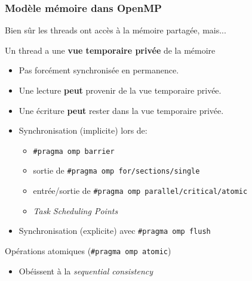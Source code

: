 \documentclass[xcolor={x11names,svgnames}]{beamer}
\begin{document}
\begin{frame}[label=omp_memory_model]
\frametitle{Modèle mémoire dans OpenMP}


Bien sûr les threads ont accès à la mémoire partagée, mais...


\begin{alertblock}{Un thread a une \textbf{vue temporaire privée} de la mémoire}
  \begin{itemize}
  \item Pas forcément synchronisée en permanence.

  \item Une lecture \textbf{peut} provenir de la vue temporaire privée.
    
  \item Une écriture \textbf{peut} rester dans la vue temporaire privée.

  \item Synchronisation (implicite) lors de:
    \begin{itemize}
    \item \texttt{\#pragma omp barrier}
    \item sortie de \texttt{\#pragma omp for/sections/single}
    \item entrée/sortie de \texttt{\#pragma omp parallel/critical/atomic}
    \item \emph{Task Scheduling Points}
    \end{itemize}

  \item Synchronisation (explicite) avec \texttt{\#pragma omp flush}
  \end{itemize}
\end{alertblock}

  \begin{exampleblock}{Opérations atomiques (\texttt{\#pragma omp atomic})}
    \begin{itemize}
    \item Obéissent à la \emph{sequential consistency}
    \end{itemize}
  \end{exampleblock}

\end{frame}
\end{document}
